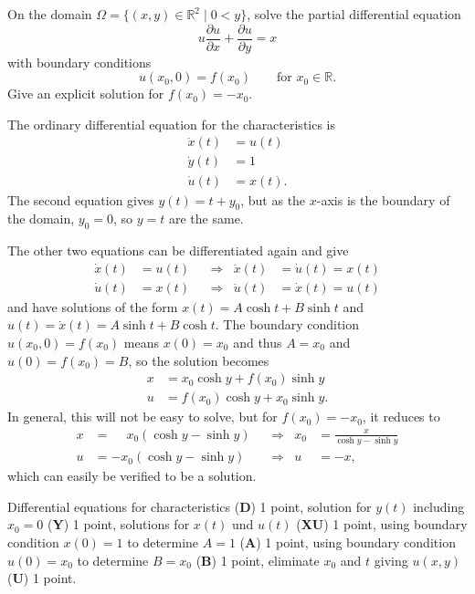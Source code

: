 On the domain $\Omega=\{(x,y)\in\mathbb{R}^2 \mid 0 < y\}$, solve the
partial differential equation
\begin{equation}
u
\frac{\partial u}{\partial x}
+
\frac{\partial u}{\partial y}
=
x
\label{30000034:pde}
\end{equation}
with boundary conditions
\[
u(x_0,0) = f(x_0)
\qquad\text{for $x_0\in\mathbb{R}$.}
\]
Give an explicit solution for $f(x_0)=-x_0$.

\begin{loesung}
The ordinary differential equation for the characteristics is
\begin{align*}
\dot{x}(t) &= u(t) \\
\dot{y}(t) &= 1 \\
\dot{u}(t) &= x(t).
\end{align*}
The second equation gives $y(t)=t+y_0$, but as the $x$-axis is the
boundary of the domain, $y_0=0$, so $y=t$ are the same.

The other two equations can be differentiated again and give
\begin{align*}
\dot{x}(t) &= u(t) &&\Rightarrow& \ddot{x}(t) &= \dot{u}(t) = x(t) \\
\dot{u}(t) &= x(t) &&\Rightarrow& \ddot{u}(t) &= \dot{x}(t) = u(t) 
\end{align*}
and have solutions of the form $x(t) = A\cosh t + B \sinh t$ and 
$u(t)=\dot{x}(t) = A\sinh t + B \cosh t$.
The boundary condition $u(x_0,0) = f(x_0)$ means $x(0)=x_0$ and thus
$A=x_0$ and $u(0)=f(x_0)=B$, so the solution becomes
\begin{align*}
x &= x_0 \cosh y + f(x_0) \sinh y
\\
u &= f(x_0) \cosh y + x_0 \sinh y.
\end{align*}
In general, this will not be easy to solve, but for $f(x_0)=-x_0$,
it reduces to
\begin{align*}
x &= \phantom{-} x_0 (\cosh y - \sinh y)
&&\Rightarrow&
x_0 &= \frac{x}{\cosh y - \sinh y}
\\
u &= -x_0 (\cosh y - \sinh y)
&&\Rightarrow&
u &= -x,
\end{align*}
which can easily be verified to be a solution.
\end{loesung}

\begin{bewertung}
Differential equations for characteristics ({\bf D}) 1 point,
solution for $y(t)$ including $x_0=0$ ({\bf Y}) 1 point,
solutions for $x(t)$ und $u(t)$ ({\bf XU}) 1 point,
using boundary condition $x(0)=1$ to determine $A=1$ ({\bf A}) 1 point,
using boundary condition $u(0)=x_0$ to determine $B=x_0$ ({\bf B}) 1 point,
eliminate $x_0$ and $t$ giving $u(x,y)$ ({\bf U}) 1 point.
\end{bewertung}

